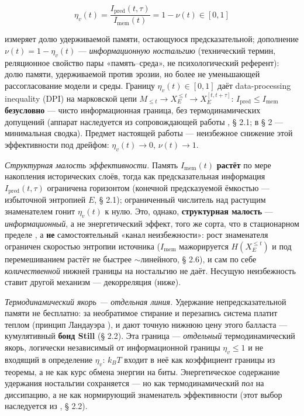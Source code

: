 \documentclass[12pt]{iopart}
\begin{document}
\[\eta_v(t) = \frac{I_{\text{pred}}(t,\tau)}{I_{\text{mem}}(t)} = 1 - \nu(t) \in [0,1]\]



измеряет долю удерживаемой памяти, остающуюся предсказательной; дополнение \(\nu(t) = 1 - \eta_v(t)\) --- \emph{информационную ностальгию} (технический термин, реляционное свойство пары «память--среда», не психологический референт): долю памяти, удерживаемой против эрозии, но более не уменьшающей рассогласование модели и среды. Границу \(\eta_v(t) \in [0,1]\) даёт data-processing inequality (DPI) на марковской цепи \(M_{\le t} \to X_E^{\le t} \to X_E^{[t,t+\tau]}\): \(I_{\text{pred}} \le I_{\text{mem}}\) \textbf{безусловно} --- чисто информационная граница, без термодинамических допущений (аппарат наследуется из сопровождающей работы \cite{Andriishin2026b}, § 2.1; в § 2 --- минимальная сводка). Предмет настоящей работы --- неизбежное снижение этой эффективности под дрейфом: \(\eta_v(t) \to 0\), \(\nu(t) \to 1\).



\emph{Структурная малость эффективности.} Память \(I_{\text{mem}}(t)\) \textbf{растёт} по мере накопления исторических слоёв, тогда как предсказательная информация \(I_{\text{pred}}(t,\tau)\) ограничена горизонтом (конечной предсказуемой ёмкостью --- избыточной энтропией \(E\), § 2.1); ограниченный числитель над растущим знаменателем гонит \(\eta_v(t)\) к нулю. Это, однако, \textbf{структурная малость} --- \emph{информационный}, а не энергетический эффект, того же сорта, что в стационарном пределе \cite{Andriishin2026b}, а \textbf{не} самостоятельный «канал неизбежности»: рост знаменателя ограничен скоростью энтропии источника (\(I_{\text{mem}}\) мажорируется \(H(X_E^{\le t})\) и под перемешиванием растёт не быстрее \(\sim\)линейного, § 2.6), и сам по себе \emph{количественной} нижней границы на ностальгию не даёт. Несущую неизбежность ставит другой механизм --- декорреляция (ниже).



\emph{Термодинамический якорь --- отдельная линия.} Удержание непредсказательной памяти не бесплатно: за необратимое стирание и перезапись система платит теплом (принцип Ландауэра \cite{Landauer1961,Bennett1982}), и \cite{Still2012} дают точную нижнюю цену этого балласта --- кумулятивный \textbf{бонд Still} (§ 2.2). Эта граница --- \emph{отдельный} термодинамический якорь, логически независимый от информационной границы \(\eta_v \le 1\) и не входящий в определение \(\eta_v\): \(k_B T\) входит в неё как коэффициент границы из теоремы, а не как курс обмена энергии на биты. Энергетическое содержание удержания ностальгии сохраняется --- но как термодинамический \emph{пол} на диссипацию, а не как нормирующий знаменатель эффективности (этот выбор наследуется из \cite{Andriishin2026b}, § 2.2).
\end{document}
